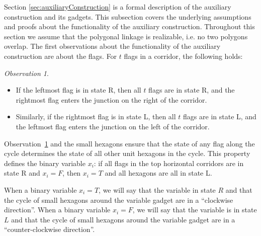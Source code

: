 \documentclass[10pt]{CSUNthesis}
\theoremstyle{plain}%
\theoremstyle{definition}
\theoremstyle{remark}
\newtheorem{observation}{Observation}
\begin{document}
Section \ref{sec:auxiliaryConstruction} is a formal description of the auxiliary construction and its gadgets.
This subsection covers the underlying assumptions and proofs about the functionality of the auxiliary construction.
Throughout this section we assume that the polygonal linkage is realizable, i.e. no two polygons overlap.  
The first observations about the functionality of the auxiliary construction are about the flags.  
For $t$ flags in a corridor, the following holds:
\begin{observation}\label{obs:corridor}
\begin{itemize}
\item[(1)] If the leftmost flag is in state R, then all $t$ flags are in state R, and the rightmost flag enters the junction on the right of the corridor.
\item[(2)] Similarly, if the rightmost flag is in state L, then all $t$ flags are in state L, and the leftmost flag enters the junction on the left of the corridor.
\end{itemize}
\end{observation}

Observation~\ref{obs:corridor} and the small hexagons ensure that the state of any flag along the cycle determines the state of all other unit hexagons in the cycle. 
This property defines the binary variable $x_i$: if all flags in the top horizontal corridors are in state R and $x_i=F$, then $x_i=T$ and all hexagons are all in state L.

When a binary variable $x_i = T$, we will say that the variable in state $R$ and that the cycle of small hexagons around the variable gadget are in a ``clockwise direction''.
When a binary variable $x_i = F$, we will say that the variable is in state $L$ and that the cycle of small hexagons around the variable gadget are in a ``counter-clockwise direction''. 
\end{document}
